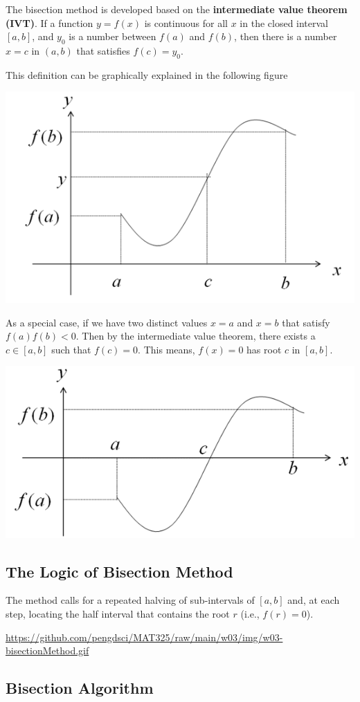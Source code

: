 \documentclass[
]{book}
\begin{document}
The bisection method is developed based on the \textbf{intermediate value theorem (IVT)}. If a function \(y = f(x)\) is continuous for all \(x\) in the closed interval \([a,b]\), and \(y_0\) is a number between \(f(a)\) and \(f(b)\), then there is a number \(x=c\) in \((a,b)\) that satisfies \(f(c) = y_0\).

This definition can be graphically explained in the following figure

\begin{center}\includegraphics[width=0.45\linewidth]{img03/w03-Bisection-IVT} \end{center}

As a special case, if we have two distinct values \(x = a\) and \(x = b\) that satisfy \(f(a)f(b) < 0\). Then by the intermediate value theorem, there exists a \(c \in [a,b]\) such that \(f(c) = 0\). This means, \(f(x) = 0\) has root \(c\) in \([a, b]\).

\begin{center}\includegraphics[width=0.45\linewidth]{img03/w03-RootExistence} \end{center}

\hypertarget{the-logic-of-bisection-method}{%
\subsection{The Logic of Bisection Method}\label{the-logic-of-bisection-method}}

The method calls for a repeated halving of sub-intervals of \([a, b]\) and, at each step, locating the half interval that contains the root \(r\) (i.e., \(f(r) = 0\)).

\url{https://github.com/pengdsci/MAT325/raw/main/w03/img/w03-bisectionMethod.gif}

\hypertarget{bisection-algorithm}{%
\subsection{Bisection Algorithm}\label{bisection-algorithm}}
\end{document}
